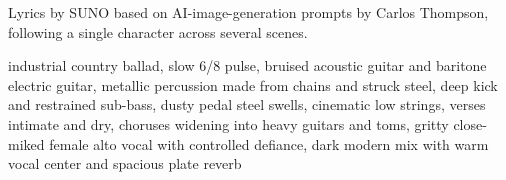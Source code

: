 
\begin{notes}
Lyrics by SUNO based on AI-image-generation prompts by Carlos Thompson, following a single character across several scenes.
\end{notes}
\begin{style}
industrial country ballad, slow 6/8 pulse, bruised acoustic guitar and baritone electric guitar, metallic percussion made from chains and struck steel, deep kick and restrained sub-bass, dusty pedal steel swells, cinematic low strings, verses intimate and dry, choruses widening into heavy guitars and toms, gritty close-miked female alto vocal with controlled defiance, dark modern mix with warm vocal center and spacious plate reverb
\end{style}
